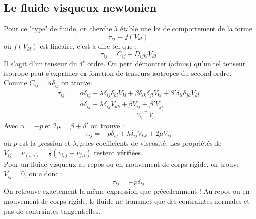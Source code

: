     
    \subsection{Le fluide visqueux newtonien}
    Pour ce "type" de fluide, on cherche à étable une loi de comportement de la forme 
    \begin{equation}
    \tau_{ij} = f(V_{kl})
    \end{equation}
    où $f(V_{kl})$ est linéaire, c'est à dire tel que :
    \begin{equation}
    \tau_{ij} = C_{ij} + D_{ijkl}V_{kl}
    \end{equation}
    Il s'agit d'un tenseur du $4^e$ ordre. On peut démontrer (admis) qu'un tel tenseur isotrope
    peut s'exprimer en fonction de tenseurs isotropes du second ordre. Comme $C_{ij} = \alpha
    \delta_{ij}$ on trouve:
    \begin{equation}
    \begin{array}{ll}
    \tau_{ij} &= \alpha\delta_{ij} + \lambda \delta_{ij}\delta_{kl}V_{kl} + \beta
    \delta_{ik}\delta_{jl}V_{kl} + \beta' \delta_{il}\delta_{jk}V_{kl}  \\
     &= \alpha\delta_{ij} + \lambda\delta_{ij}V_{kk} + \underbrace{\beta V_{ij} + \beta' 
     V_{ji}}_{V_{ij} = V_{ji}}
    \end{array}
    \end{equation}
    Avec $\alpha = -p$ et $2\mu = \beta + \beta'$ on trouve :
    \begin{equation}
    \tau_{ij} = -p\delta_{ij} + \lambda\delta_{ij}V_{kk} + 2\mu V_{ij}
    \label{eq:ComportementVisqNew}
    \end{equation}
    où $p$ est la pression et $\lambda,\mu$ les coefficients de viscosité. Les propriétés
    de $V_{ij} = v_{(i,j)} = \frac{1}{2}(v_{i,j}+v_{j,i})$ restent vérifiées.\\
    Pour un fluide visqueux au repos ou en mouvement de corps rigide, on trouve $V_{ij}=0$, 
    on a donc :
    \begin{equation}
    \tau_{ij} = -p\delta_{ij}
    \end{equation}
    On retrouve exactement la même expression que précédemment ! Au repos ou en mouvement 
    de corps rigide, le fluide ne transmet que des contraintes normales et pas de contraintes
    tangentielles.
    
